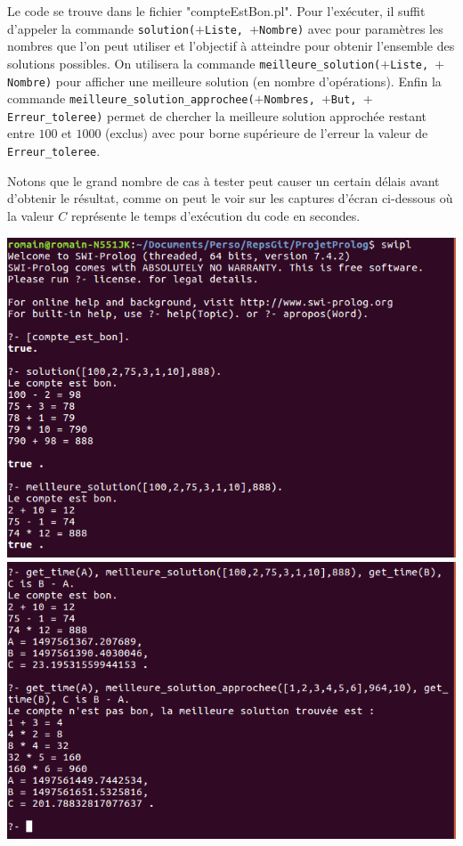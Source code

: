 \documentclass[12pt,a4paper]{article}
\begin{document}
Le code se trouve dans le fichier "compteEstBon.pl". Pour l'exécuter, il suffit d'appeler la commande \texttt{solution($+$Liste, $+$Nombre)} avec pour paramètres les nombres que l'on peut utiliser et l'objectif à atteindre pour obtenir l'ensemble des solutions possibles. On utilisera la commande \texttt{meilleure\_solution($+$Liste, $+$Nombre)} pour afficher une meilleure solution (en nombre d'opérations). Enfin la commande \texttt{meilleure\_solution\_approchee($+$Nombres, $+$But, $+$Erreur\_toleree)} permet de chercher la meilleure solution approchée restant entre $100$ et $1000$ (exclus) avec pour borne supérieure de l'erreur la valeur de \texttt{Erreur\_toleree}.

Notons que le grand nombre de cas à tester peut causer un certain délais avant d'obtenir le résultat, comme on peut le voir sur les captures d'écran ci-dessous où la valeur $C$ représente le temps d'exécution du code en secondes. 

\begin{center}
\includegraphics[width = 400pt]{SolutionCompteEstBon1.png}
\includegraphics[width = 400pt]{SolutionCompteEstBon2.png}
\end{center}
\end{document}
